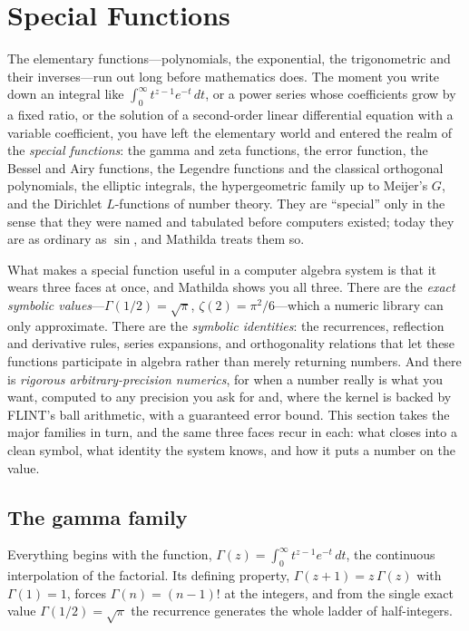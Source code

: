 \section{Special Functions}
\label{sec:specialfns}

The elementary functions---polynomials, the exponential, the trigonometric and
their inverses---run out long before mathematics does. The moment you write down
an integral like \(\int_0^\infty t^{z-1}e^{-t}\,dt\), or a power series whose
coefficients grow by a fixed ratio, or the solution of a second-order linear
differential equation with a variable coefficient, you have left the elementary
world and entered the realm of the \emph{special functions}: the gamma and zeta
functions, the error function, the Bessel and Airy functions, the Legendre
functions and the classical orthogonal polynomials, the elliptic integrals, the
hypergeometric family up to Meijer's \(G\), and the Dirichlet
\(L\)-functions of number theory. They are ``special'' only in
the sense that they were named and tabulated before computers existed; today they
are as ordinary as \(\sin\), and Mathilda treats them so.

What makes a special function useful in a computer algebra system is that it wears
three faces at once, and Mathilda shows you all three. There are the
\emph{exact symbolic values}---\(\Gamma(1/2)=\sqrt\pi\), \(\zeta(2)=\pi^2/6\)---which a
numeric library can only approximate. There are the \emph{symbolic identities}: the
recurrences, reflection and derivative rules, series expansions, and orthogonality
relations that let these functions participate in algebra rather than merely
returning numbers. And there is \emph{rigorous arbitrary-precision numerics}, for
when a number really is what you want, computed to any precision you ask for and,
where the kernel is backed by FLINT's ball arithmetic, with a guaranteed error
bound. This section takes the major families in turn, and the same three faces
recur in each: what closes into a clean symbol, what identity the system knows, and
how it puts a number on the value.

\subsection{The gamma family}
\label{ssec:sf-gamma}

Everything begins with the  function, \(\Gamma(z)=\int_0^\infty
t^{z-1}e^{-t}\,dt\), the continuous interpolation of the
factorial. Its defining property, \(\Gamma(z+1)=z\,\Gamma(z)\)
with \(\Gamma(1)=1\), forces \(\Gamma(n)=(n-1)!\) at the integers, and from the
single exact value \(\Gamma(1/2)=\sqrt\pi\) the recurrence generates the whole
ladder of half-integers.

